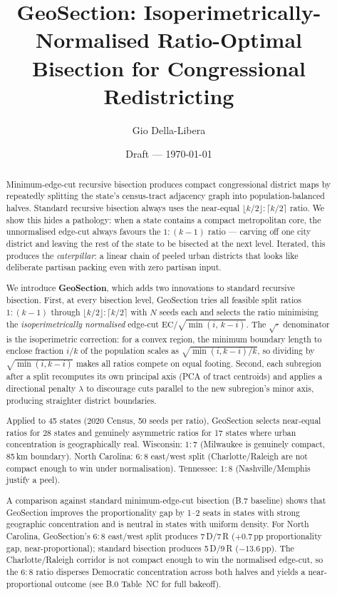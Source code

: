 \documentclass[12pt]{article}
\title{GeoSection: Isoperimetrically-Normalised Ratio-Optimal\\
       Bisection for Congressional Redistricting}
\author{Gio Della-Libera}
\date{Draft --- \today}
\begin{document}
\maketitle

\begin{abstract}
Minimum-edge-cut recursive bisection produces compact congressional district maps
by repeatedly splitting the state's census-tract adjacency graph into
population-balanced halves.
Standard recursive bisection always uses the near-equal $\lfloor k/2\rfloor:\lceil k/2\rceil$ ratio.
We show this hides a pathology: when a state contains a compact metropolitan
core, the unnormalised edge-cut always favours the $1:(k-1)$ ratio
--- carving off one city district and leaving the rest of the state
to be bisected at the next level.
Iterated, this produces the \emph{caterpillar}: a linear chain of peeled
urban districts that looks like deliberate partisan packing even with
zero partisan input.

We introduce \textbf{GeoSection}, which adds two innovations to standard
recursive bisection.
First, at every bisection level, GeoSection tries all feasible split ratios
$1:(k-1)$ through $\lfloor k/2\rfloor:\lceil k/2\rceil$ with $N$ seeds each
and selects the ratio minimising the \emph{isoperimetrically normalised}
edge-cut $\mathrm{EC}/\sqrt{\min(i,\,k-i)}$.
The $\sqrt{\cdot}$ denominator is the isoperimetric correction: for a convex region,
the minimum boundary length to enclose fraction $i/k$ of the population
scales as $\sqrt{\min(i,k-i)/k}$, so dividing by $\sqrt{\min(i,k-i)}$
makes all ratios compete on equal footing.
Second, each subregion after a split recomputes its own principal axis
(PCA of tract centroids) and applies a directional penalty $\lambda$
to discourage cuts parallel to the new subregion's minor axis,
producing straighter district boundaries.

Applied to 45 states (2020 Census, 50 seeds per ratio), GeoSection
selects near-equal ratios for 28 states and genuinely asymmetric ratios
for 17 states where urban concentration is geographically real.
Wisconsin: $1:7$ (Milwaukee is genuinely compact, 85\,km boundary).
North Carolina: $6:8$ east/west split (Charlotte/Raleigh are not
compact enough to win under normalisation).
Tennessee: $1:8$ (Nashville/Memphis justify a peel).

A comparison against standard minimum-edge-cut bisection (B.7 baseline)
shows that GeoSection improves the proportionality gap by 1--2 seats in
states with strong geographic concentration and is neutral in states
with uniform density.
For North Carolina, GeoSection's $6:8$ east/west split produces 7\,D/7\,R
($+0.7$\,pp proportionality gap, near-proportional); standard bisection
produces 5\,D/9\,R ($-13.6$\,pp).
The Charlotte/Raleigh corridor is not compact enough to win the normalised
edge-cut, so the $6:8$ ratio disperses Democratic concentration across both
halves and yields a near-proportional outcome (see B.0 Table~NC for full
bakeoff).
\end{abstract}










\end{document}
